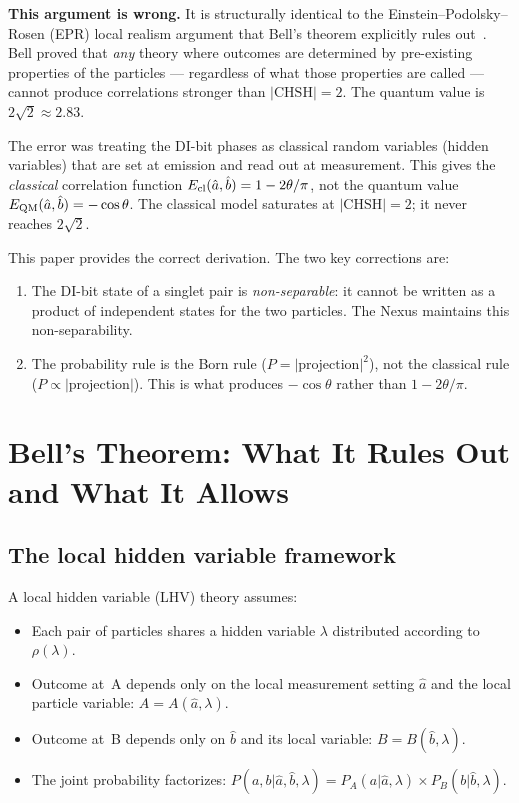 \documentclass[11pt,a4paper]{article}
\begin{document}
\textbf{This argument is wrong.}  It is structurally identical to the
Einstein--Podolsky--Rosen (EPR) local realism argument that Bell's
theorem explicitly rules out~\citep{bell1964}.  Bell proved that
\emph{any} theory where outcomes are determined by pre-existing
properties of the particles --- regardless of what those properties are
called --- cannot produce correlations stronger than $|\mathrm{CHSH}|
= 2$.  The quantum value is $2\sqrt{2} \approx 2.83$.

The error was treating the DI-bit phases as classical random variables
(hidden variables) that are set at emission and read out at measurement.
This gives the \emph{classical} correlation function
$E_{\rm cl}(\hat{a},\hat{b}) = 1 - 2\theta/\pi$, not the quantum value
$E_{\rm QM}(\hat{a},\hat{b}) = -\cos\theta$.  The classical model saturates
at $|\mathrm{CHSH}| = 2$; it never reaches $2\sqrt{2}$.

This paper provides the correct derivation.  The two key corrections are:
\begin{enumerate}
\item The DI-bit state of a singlet pair is \emph{non-separable}: it
  cannot be written as a product of independent states for the two
  particles.  The Nexus maintains this non-separability.
\item The probability rule is the Born rule ($P = |\text{projection}|^2$),
  not the classical rule ($P \propto |\text{projection}|$).  This is
  what produces $-\cos\theta$ rather than $1 - 2\theta/\pi$.
\end{enumerate}

\section{Bell's Theorem: What It Rules Out and What It Allows}
\label{sec:bell}

\subsection{The local hidden variable framework}

A local hidden variable (LHV) theory assumes:
\begin{itemize}
\item Each pair of particles shares a hidden variable $\lambda$
  distributed according to $\rho(\lambda)$.
\item Outcome at~A depends only on the local measurement setting $\hat{a}$
  and the local particle variable: $A = A(\hat{a}, \lambda)$.
\item Outcome at~B depends only on $\hat{b}$ and its local variable:
  $B = B(\hat{b}, \lambda)$.
\item The joint probability factorizes:
  $P(a,b|\hat{a},\hat{b},\lambda) = P_A(a|\hat{a},\lambda) \times
   P_B(b|\hat{b},\lambda)$.
\end{itemize}
\end{document}
